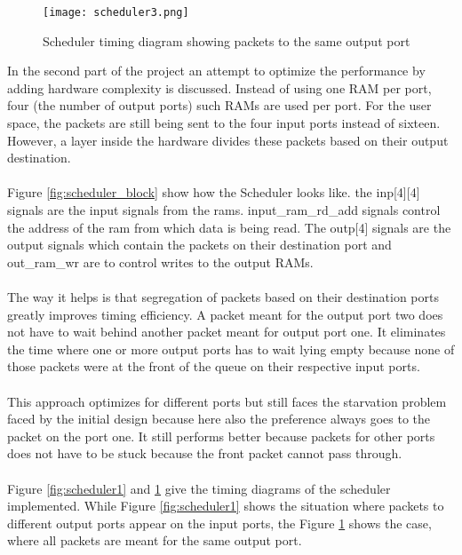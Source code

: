 \documentclass[twoside,12pt,fleqn]{book} %
\begin{document}
\begin{figure}[ht]
    \centering
    \texttt{[image: scheduler3.png]}
    \caption{Scheduler timing diagram showing packets to the same output port}
    \label{fig:scheduler2}
\end{figure}
In the second part of the project an attempt to optimize the performance by adding hardware complexity is discussed. Instead of using one RAM per port, four (the number of output ports) such RAMs are used per port. For the user space, the packets are still being sent to the four input ports instead of sixteen. However, a layer inside the hardware divides these packets based on their output destination.\\\\
Figure \ref{fig:scheduler_block} show how the Scheduler looks like. the inp[4][4] signals are the input signals from the rams. input\_ram\_rd\_add signals control the address of the ram from which data is being read. The outp[4] signals are the output signals which contain the packets on their destination port and out\_ram\_wr are to control writes to the output RAMs.\\\\
The way it helps is that segregation of packets based on their destination ports greatly improves timing efficiency. A packet meant for the output port two does not have to wait behind another packet meant for output port one. It eliminates the time where one or more output ports has to wait lying empty because none of those packets were at the front of the queue on their respective input ports.\\\\
This approach optimizes for different ports but still faces the starvation problem faced by the initial design because here also the preference always goes to the packet on the port one. It still performs better because packets for other ports does not have to be stuck because the front packet cannot pass through.\\\\
Figure \ref{fig:scheduler1} and \ref{fig:scheduler2} give the timing diagrams of the scheduler implemented. While Figure \ref{fig:scheduler1} shows the situation where packets to different output ports appear on the input ports, the Figure \ref{fig:scheduler2} shows the case, where all packets are meant for the same output port.
\end{document}
